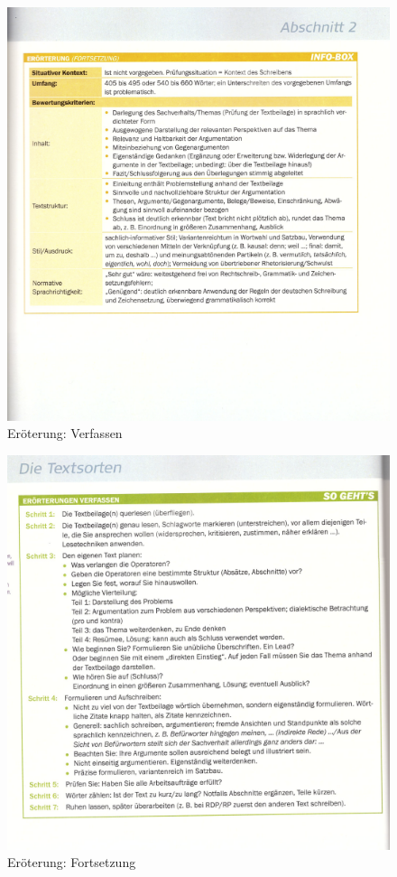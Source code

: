 \begin{figure}[h][p]
    \centering
    \includegraphics[scale=0.8]{pics/Screenshot from 2023-02-06 12-27-06.png}
    \caption{Eröterung: Verfassen}
    \label{fig:impl:eröterung2}
\end{figure}
\begin{figure}[h][p]
    \centering
    \includegraphics[scale=0.8]{pics/Screenshot from 2023-02-06 12-27-29.png}
    \caption{Eröterung: Fortsetzung}
    \label{fig:impl:eröterung3}
\end{figure}
